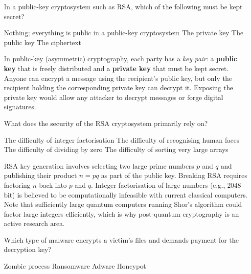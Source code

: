 \documentclass[answers]{exam}
\begin{document}
\begin{questions}
\question In a public-key cryptosystem such as RSA, which of the following must be kept secret?

\begin{choices}
    \choice Nothing; everything is public in a public-key cryptosystem
    \correctchoice The private key
    \choice The public key
    \choice The ciphertext
\end{choices}

\begin{solution}
    In public-key (asymmetric) cryptography, each party has a \textit{key pair}: a \textbf{public key} that is freely distributed and a \textbf{private key} that must be kept secret.
    Anyone can encrypt a message using the recipient's public key, but only the recipient holding the corresponding private key can decrypt it.
    Exposing the private key would allow any attacker to decrypt messages or forge digital signatures.
\end{solution}

\question What does the security of the RSA cryptosystem primarily rely on?

\begin{choices}
    \correctchoice The difficulty of integer factorisation
    \choice The difficulty of recognising human faces
    \choice The difficulty of dividing by zero
    \choice The difficulty of sorting very large arrays
\end{choices}

\begin{solution}
    RSA key generation involves selecting two large prime numbers $p$ and $q$ and publishing their product $n = pq$ as part of the public key.
    Breaking RSA requires factoring $n$ back into $p$ and $q$.
    Integer factorisation of large numbers (e.g., 2048-bit) is believed to be computationally infeasible with current classical computers.
    Note that sufficiently large quantum computers running Shor's algorithm could factor large integers efficiently, which is why post-quantum cryptography is an active research area.
\end{solution}

\question Which type of malware encrypts a victim's files and demands payment for the decryption key?

\begin{oneparchoices}
    \choice Zombie process
    \correctchoice Ransomware
    \choice Adware
    \choice Honeypot
\end{oneparchoices}


\end{questions}
\end{document}
